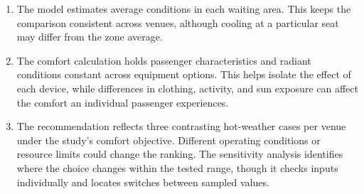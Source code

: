 \begin{enumerate}
    \item
    The model estimates average conditions in each waiting area. This keeps the comparison consistent across venues, although cooling at a particular seat may differ from the zone average.

    \item
    The comfort calculation holds passenger characteristics and radiant conditions constant across equipment options. This helps isolate the effect of each device, while differences in clothing, activity, and sun exposure can affect the comfort an individual passenger experiences.

    \item
    The recommendation reflects three contrasting hot-weather cases per venue under the study's comfort objective. Different operating conditions or resource limits could change the ranking. The sensitivity analysis identifies where the choice changes within the tested range, though it checks inputs individually and locates switches between sampled values.
\end{enumerate}